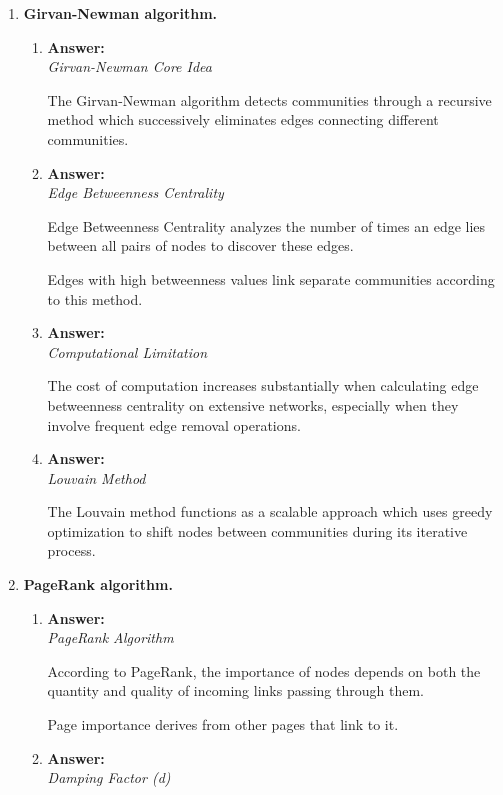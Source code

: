 \documentclass[a4paper,12pt]{article}
\begin{document}
\begin{enumerate}[label=\textbf{Q\arabic*.}]
    \item \textbf{Girvan-Newman algorithm.}
    \begin{enumerate}[label=(\alph*)]
        \item \textbf{Answer:} \\
        \textit{Girvan-Newman Core Idea}

        The Girvan-Newman algorithm detects communities through a recursive method which successively eliminates edges connecting different communities.
        
        \item \textbf{Answer:} \\
        \textit{Edge Betweenness Centrality}

        Edge Betweenness Centrality analyzes the number of times an edge lies between all pairs of nodes to discover these edges.

        Edges with high betweenness values link separate communities according to this method.
        
        \item \textbf{Answer:} \\
        \textit{Computational Limitation}

        The cost of computation increases substantially when calculating edge betweenness centrality on extensive networks, especially when they involve frequent edge removal operations.
        
        \item \textbf{Answer:} \\
        \textit{Louvain Method}

        The Louvain method functions as a scalable approach which uses greedy optimization to shift nodes between communities during its iterative process.
    \end{enumerate}
    
    \item \textbf{PageRank algorithm.}
    \begin{enumerate}[label=(\alph*)]
        \item \textbf{Answer:} \\
        \textit{PageRank Algorithm}

        According to PageRank, the importance of nodes depends on both the quantity and quality of incoming links passing through them.

        Page importance derives from other pages that link to it.
        
        \item \textbf{Answer:} \\
        \textit{Damping Factor (d)}


\end{enumerate}
\end{enumerate}
\end{document}
